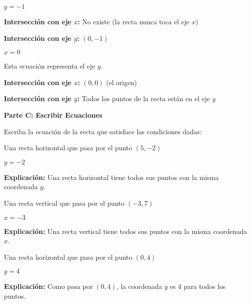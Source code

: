 \begin{exercise}
\problem $y = -1$

\begin{solucion}
\textbf{Intersección con eje $x$:} No existe (la recta nunca toca el eje $x$)

\textbf{Intersección con eje $y$:} $(0, -1)$
\end{solucion}

\problem $x = 0$

\begin{solucion}
Esta ecuación representa el eje $y$.

\textbf{Intersección con eje $x$:} $(0, 0)$ (el origen)

\textbf{Intersección con eje $y$:} Todos los puntos de la recta están en el eje $y$
\end{solucion}

\vspace{0.5cm}

\textbf{Parte C: Escribir Ecuaciones}

Escriba la ecuación de la recta que satisface las condiciones dadas:

\problem Una recta horizontal que pasa por el punto $(5, -2)$

\begin{solucion}
$y = -2$

\textbf{Explicación:} Una recta horizontal tiene todos sus puntos con la misma coordenada $y$.
\end{solucion}

\problem Una recta vertical que pasa por el punto $(-3, 7)$

\begin{solucion}
$x = -3$

\textbf{Explicación:} Una recta vertical tiene todos sus puntos con la misma coordenada $x$.
\end{solucion}

\problem Una recta horizontal que pasa por el punto $(0, 4)$

\begin{solucion}
$y = 4$

\textbf{Explicación:} Como pasa por $(0, 4)$, la coordenada $y$ es 4 para todos los puntos.
\end{solucion}
\end{exercise}

